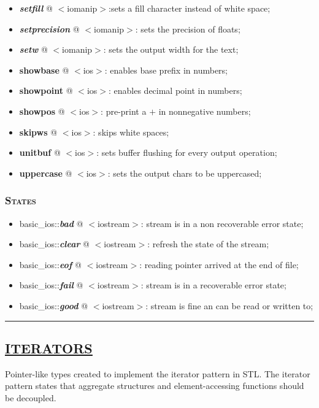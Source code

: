 \documentclass[10pt]{article}
\begin{document}
\begin{multicols*}{4}
{\begin{itemize}[leftmargin=*,topsep=0.25pt]
	\item \emph{\textbf{setfill}} @ $<$iomanip$>$:sets a fill character instead of white space; 
	\item \emph{\textbf{setprecision}} @ $<$iomanip$>$: sets the precision of floats; 
	\item \emph{\textbf{setw}} @ $<$iomanip$>$: sets the output width for the text; 
	\item \textbf{showbase} @ $<$ios$>$: enables base prefix in numbers;
	\item \textbf{showpoint} @ $<$ios$>$: enables decimal point in numbers;
	\item \textbf{showpos} @ $<$ios$>$: pre-print a $+$ in nonnegative numbers;
	\item \textbf{skipws} @ $<$ios$>$: skips white spaces;
	\item \textbf{unitbuf} @ $<$ios$>$: sets buffer flushing for every output operation;
	\item \textbf{uppercase} @ $<$ios$>$: sets the output chars to be uppercased;
\end{itemize}

\subsubsection*{\textsc{States}} 
\begin{itemize}[leftmargin=*,topsep=0.25pt]
  \setlength\itemsep{-1.8pt}
	\item basic\_ios::\emph{\textbf{bad}} @ $<$iostream$>$: stream is in a non recoverable error state;
	\item basic\_ios::\emph{\textbf{clear}} @ $<$iostream$>$: refresh the state of the stream;
	\item basic\_ios::\emph{\textbf{eof}} @ $<$iostream$>$: reading pointer arrived at the end of file;
	\item basic\_ios::\emph{\textbf{fail}} @ $<$iostream$>$: stream is in a recoverable error state;
	\item basic\_ios::\emph{\textbf{good}} @ $<$iostream$>$: stream is fine an can be read or written to;
\end{itemize}


}

\par\noindent\rule{197pt}{0.4pt}

{\color{Blue}
\subsection*{\href{https://en.cppreference.com/w/cpp/iterator}{\underline{ITERATORS}}}	
\noindent
Pointer-like types created to implement the iterator pattern in STL. The iterator pattern states that aggregate structures and element-accessing functions should be decoupled.

}
\end{multicols*}
\end{document}
